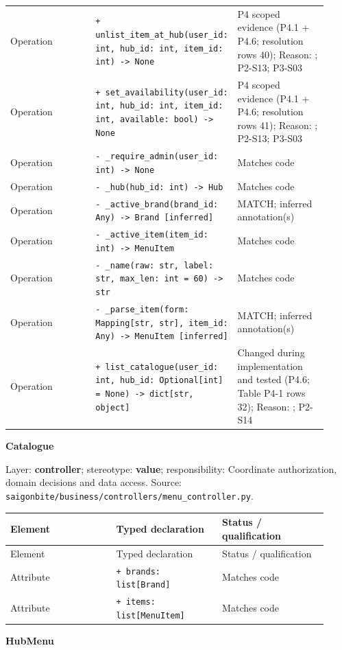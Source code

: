 \begin{longtable}{>{\raggedright\arraybackslash}p{0.3067\linewidth}>{\raggedright\arraybackslash}p{0.3067\linewidth}>{\raggedright\arraybackslash}p{0.3067\linewidth}}
Operation & \texttt{+ unlist\_\allowbreak{}item\_\allowbreak{}at\_\allowbreak{}hub(user\_\allowbreak{}id: int, hub\_\allowbreak{}id: int, item\_\allowbreak{}id: int) -\textgreater{} None } & P4 scoped evidence (P4.1 + P4.6; resolution rows 40); Reason: ; P2-S13; P3-S03 \\
Operation & \texttt{+ set\_\allowbreak{}availability(user\_\allowbreak{}id: int, hub\_\allowbreak{}id: int, item\_\allowbreak{}id: int, available: bool) -\textgreater{} None } & P4 scoped evidence (P4.1 + P4.6; resolution rows 41); Reason: ; P2-S13; P3-S03 \\
Operation & \texttt{- \_\allowbreak{}require\_\allowbreak{}admin(user\_\allowbreak{}id: int) -\textgreater{} None} & Matches code \\
Operation & \texttt{- \_\allowbreak{}hub(hub\_\allowbreak{}id: int) -\textgreater{} Hub} & Matches code \\
Operation & \texttt{- \_\allowbreak{}active\_\allowbreak{}brand(brand\_\allowbreak{}id: Any) -\textgreater{} Brand [inferred]} & MATCH; inferred annotation(s) \\
Operation & \texttt{- \_\allowbreak{}active\_\allowbreak{}item(item\_\allowbreak{}id: int) -\textgreater{} MenuItem} & Matches code \\
Operation & \texttt{- \_\allowbreak{}name(raw: str, label: str, max\_\allowbreak{}len: int = 60) -\textgreater{} str} & Matches code \\
Operation & \texttt{- \_\allowbreak{}parse\_\allowbreak{}item(form: Mapping[str, str], item\_\allowbreak{}id: Any) -\textgreater{} MenuItem [inferred]} & MATCH; inferred annotation(s) \\
Operation & \texttt{+ list\_\allowbreak{}catalogue(user\_\allowbreak{}id: int, hub\_\allowbreak{}id: Optional[int] = None) -\textgreater{} dict[str, object] } & Changed during implementation and tested (P4.6; Table P4-1 rows 32); Reason: ; P2-S14 \\
\end{longtable}
\textbf{Catalogue}

Layer: \textbf{controller}; stereotype: \textbf{\guillemotleft{}value\guillemotright{}}; responsibility: Coordinate authorization, domain decisions and data access. Source: \texttt{saigonbite/\allowbreak{}business/\allowbreak{}controllers/\allowbreak{}menu\_\allowbreak{}controller.\allowbreak{}py}.

\begin{longtable}{>{\raggedright\arraybackslash}p{0.3067\linewidth}>{\raggedright\arraybackslash}p{0.3067\linewidth}>{\raggedright\arraybackslash}p{0.3067\linewidth}}
Element & Typed declaration & Status / qualification \\
\hline\endfirsthead
Element & Typed declaration & Status / qualification \\
\hline\endhead
Attribute & \texttt{+ brands: list[Brand]} & Matches code \\
Attribute & \texttt{+ items: list[MenuItem]} & Matches code \\
\end{longtable}
\textbf{HubMenu}

